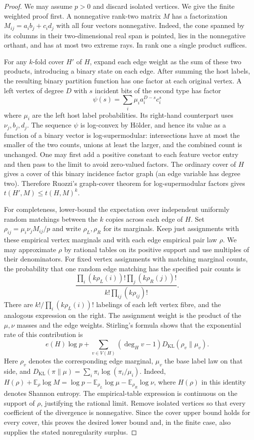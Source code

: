 \documentclass[11pt]{article}
\begin{document}
\begin{proof}
We may assume $p>0$ and discard isolated vertices. We give the finite weighted proof first. A nonnegative rank-two matrix $M$ has a factorization
$M_{ij}=a_i b_j+c_i d_j$ with all four vectors nonnegative. Indeed, the cone spanned by its columns in their two-dimensional real span is pointed, lies in the nonnegative orthant, and has at most two extreme rays. In rank one a single product suffices.

For any $k$-fold cover $H'$ of $H$, expand each edge weight as the sum of these two products, introducing a binary state on each edge. After summing the host labels, the resulting binary partition function has one factor at each original vertex. A left vertex of degree $D$ with $s$ incident bits of the second type has factor
\[
 \psi(s)=\sum_i\mu_i a_i^{D-s}c_i^s
\]
where $\mu_i$ are the left host label probabilities. Its right-hand counterpart uses $\nu_j,b_j,d_j$. The sequence $\psi$ is log-convex by H\"older, and hence its value as a function of a binary vector is log-supermodular: intersections have at most the smaller of the two counts, unions at least the larger, and the combined count is unchanged. One may first add a positive constant to each feature vector entry and then pass to the limit to avoid zero-valued factors. The ordinary cover of $H$ gives a cover of this binary incidence factor graph (an edge variable has degree two). Therefore Ruozzi's graph-cover theorem for log-supermodular factors \cite[Theorem 4.1]{ruozzi} gives $t(H',M)\le t(H,M)^k$.

For completeness, lower-bound the expectation over independent uniformly random matchings between the $k$ copies across each edge of $H$. Set $\rho_{ij}=\mu_i\nu_j M_{ij}/p$ and write $\rho_L,\rho_R$ for its marginals. Keep just assignments with these empirical vertex marginals and with each edge empirical pair law $\rho$. We may approximate $\rho$ by rational tables on its positive support and use multiples of their denominators. For fixed vertex assignments with matching marginal counts, the probability that one random edge matching has the specified pair counts is
\[
 \frac{\prod_i(k\rho_L(i))!\prod_j(k\rho_R(j))!}
 {k!\prod_{ij}(k\rho_{ij})!}.
\]
There are $k!/\prod_i(k\rho_L(i))!$ labelings of each left vertex fibre, and the analogous expression on the right. The assignment weight is the product of the $\mu,\nu$ masses and the edge weights. Stirling's formula shows that the exponential rate of this contribution is
\[
 e(H)\log p+\sum_{v\in V(H)}
 (\deg_H v-1)D_{\mathrm{KL}}(\rho_v\|\mu_v).
\]
Here $\rho_v$ denotes the corresponding edge marginal, $\mu_v$ the base label law on that side, and $D_{\mathrm{KL}}(\pi\|\mu)=\sum_i\pi_i\log(\pi_i/\mu_i)$. Indeed,
$H(\rho)+\mathbb E_\rho\log M=\log p-\mathbb E_{\rho_L}\log\mu-\mathbb E_{\rho_R}\log\nu$, where $H(\rho)$ in this identity denotes Shannon entropy. The empirical-table expression is continuous on the support of $\rho$, justifying the rational limit. Remove isolated vertices so that every coefficient of the divergence is nonnegative. Since the cover upper bound holds for every cover, this proves the desired lower bound and, in the finite case, also supplies the stated nonregularity surplus.


\end{proof}
\end{document}
